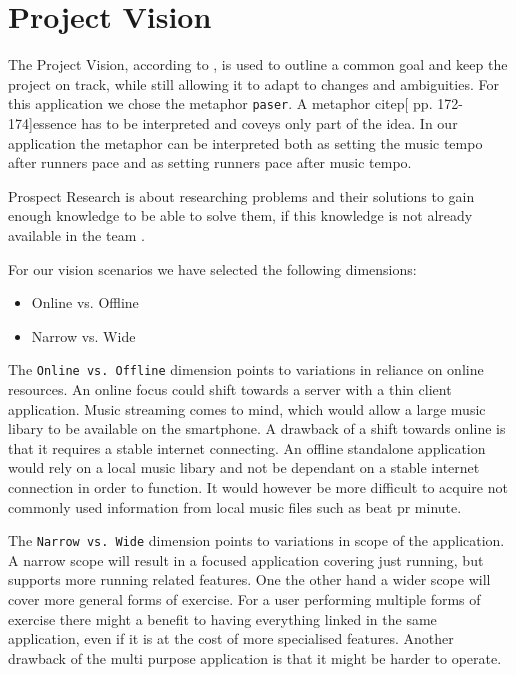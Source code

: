 \section{Project Vision}
The Project Vision, according to \citet[ p. 104]{essence}, is used to outline a common goal and keep the project on track, while still allowing it to adapt to changes and ambiguities.
For this application we chose the metaphor \texttt{paser}. A metaphor citep[ pp. 172-174]{essence} has to be interpreted and coveys only part of the idea. In our application the metaphor can be interpreted both as setting the music tempo after runners pace and as setting runners pace after music tempo. 

Prospect Research is about researching problems and their solutions to gain enough knowledge to be able to solve them, if this knowledge is not already available in the team \citep[ pp. 104-105]{essence}.

For our vision scenarios \cite[ p. 127]{essence} we have selected the following dimensions:
\begin{itemize}
\item Online vs. Offline %
\item Narrow vs. Wide
\end{itemize}

The \texttt{Online vs. Offline} dimension points to variations in reliance on online resources. An online focus could shift  towards a server with a thin client application. Music streaming comes to mind, which would allow a large music libary to be available on the smartphone. A drawback of a shift towards online is that it requires a stable internet connecting. An offline standalone application would rely on a local music libary and not be dependant on a stable internet connection in order to function. It would however be more difficult to acquire not commonly used information from local music files such as beat pr minute.

The \texttt{Narrow vs. Wide} dimension points to variations in scope of the application. A narrow scope will result in a focused application covering just running, but supports more running related features. One the other hand a wider scope will cover more general forms of exercise. For a user performing multiple forms of exercise there might a benefit to having everything linked in the same application, even if it is at the cost of more specialised features. Another drawback of the multi purpose application is that it might be harder to operate.


